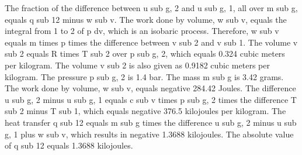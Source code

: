 The fraction of the difference between u sub g, 2 and u sub g, 1, all over m sub g, equals q sub 12 minus w sub v. The work done by volume, w sub v, equals the integral from 1 to 2 of p dv, which is an isobaric process. Therefore, w sub v equals m times p times the difference between v sub 2 and v sub 1. The volume v sub 2 equals R times T sub 2 over p sub g, 2, which equals 0.324 cubic meters per kilogram. The volume v sub 2 is also given as 0.9182 cubic meters per kilogram. The pressure p sub g, 2 is 1.4 bar. The mass m sub g is 3.42 grams. The work done by volume, w sub v, equals negative 284.42 Joules. The difference u sub g, 2 minus u sub g, 1 equals c sub v times p sub g, 2 times the difference T sub 2 minus T sub 1, which equals negative 376.5 kilojoules per kilogram. The heat transfer q sub 12 equals m sub g times the difference u sub g, 2 minus u sub g, 1 plus w sub v, which results in negative 1.3688 kilojoules. The absolute value of q sub 12 equals 1.3688 kilojoules.